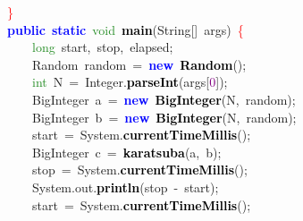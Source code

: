 {{\mbox{}\ \ \ \ \textcolor{Red}{\}} \\
\mbox{}\ \ \ \ \textbf{\textcolor{Blue}{public}}\ \textbf{\textcolor{Blue}{static}}\ \textcolor{ForestGreen}{void}\ \textbf{\textcolor{Black}{main}}\textcolor{BrickRed}{(}String\textcolor{BrickRed}{[]}\ args\textcolor{BrickRed}{)}\ \textcolor{Red}{\{} \\
\mbox{}\ \ \ \ \ \ \ \ \textcolor{ForestGreen}{long}\ start\textcolor{BrickRed}{,}\ stop\textcolor{BrickRed}{,}\ elapsed\textcolor{BrickRed}{;} \\
\mbox{}\ \ \ \ \ \ \ \ \textcolor{TealBlue}{Random}\ random\ \textcolor{BrickRed}{=}\ \textbf{\textcolor{Blue}{new}}\ \textbf{\textcolor{Black}{Random}}\textcolor{BrickRed}{();} \\
\mbox{}\ \ \ \ \ \ \ \ \textcolor{ForestGreen}{int}\ N\ \textcolor{BrickRed}{=}\ Integer\textcolor{BrickRed}{.}\textbf{\textcolor{Black}{parseInt}}\textcolor{BrickRed}{(}args\textcolor{BrickRed}{[}\textcolor{Purple}{0}\textcolor{BrickRed}{]);} \\
\mbox{}\ \ \ \ \ \ \ \ \textcolor{TealBlue}{BigInteger}\ a\ \textcolor{BrickRed}{=}\ \textbf{\textcolor{Blue}{new}}\ \textbf{\textcolor{Black}{BigInteger}}\textcolor{BrickRed}{(}N\textcolor{BrickRed}{,}\ random\textcolor{BrickRed}{);} \\
\mbox{}\ \ \ \ \ \ \ \ \textcolor{TealBlue}{BigInteger}\ b\ \textcolor{BrickRed}{=}\ \textbf{\textcolor{Blue}{new}}\ \textbf{\textcolor{Black}{BigInteger}}\textcolor{BrickRed}{(}N\textcolor{BrickRed}{,}\ random\textcolor{BrickRed}{);} \\
\mbox{}\ \ \ \ \ \ \ \ start\ \textcolor{BrickRed}{=}\ System\textcolor{BrickRed}{.}\textbf{\textcolor{Black}{currentTimeMillis}}\textcolor{BrickRed}{();}\  \\
\mbox{}\ \ \ \ \ \ \ \ \textcolor{TealBlue}{BigInteger}\ c\ \textcolor{BrickRed}{=}\ \textbf{\textcolor{Black}{karatsuba}}\textcolor{BrickRed}{(}a\textcolor{BrickRed}{,}\ b\textcolor{BrickRed}{);} \\
\mbox{}\ \ \ \ \ \ \ \ stop\ \textcolor{BrickRed}{=}\ System\textcolor{BrickRed}{.}\textbf{\textcolor{Black}{currentTimeMillis}}\textcolor{BrickRed}{();} \\
\mbox{}\ \ \ \ \ \ \ \ System\textcolor{BrickRed}{.}out\textcolor{BrickRed}{.}\textbf{\textcolor{Black}{println}}\textcolor{BrickRed}{(}stop\ \textcolor{BrickRed}{-}\ start\textcolor{BrickRed}{);} \\
\mbox{}\ \ \ \ \ \ \ \ start\ \textcolor{BrickRed}{=}\ System\textcolor{BrickRed}{.}\textbf{\textcolor{Black}{currentTimeMillis}}\textcolor{BrickRed}{();}\  \\
}}
